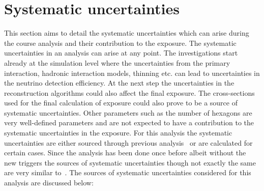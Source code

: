 \section{Systematic uncertainties}
\label{sec:det_uncert}
This section aims to detail the systematic uncertainties which can arise during the course analysis and their contribution to the exposure. The systematic uncertainties in an analysis can arise at any point. The investigations start already at the simulation level where the uncertainties from the primary interaction, hadronic interaction models, thinning etc. can lead to uncertainties in the neutrino detection efficiency. At the next step the uncertainties in the reconstruction algorithms could also affect the final exposure. The cross-sections used for the final calculation of exposure could also prove to be a source of systematic uncertainties. Other parameters such as the number of hexagons are very well-defined parameters and are not expected to have a contribution to the systematic uncertainties in the exposure. For this analysis the systematic uncertainties are either sourced through previous analysis~\cite{gap_systematics} or are calculated for certain cases. Since the analysis has been done once before albeit without the new triggers the sources of systematic uncertainties though not exactly the same are very similar to~\cite{gap_note_2013}. 
The sources of systematic uncertainties considered for this analysis are discussed below:

